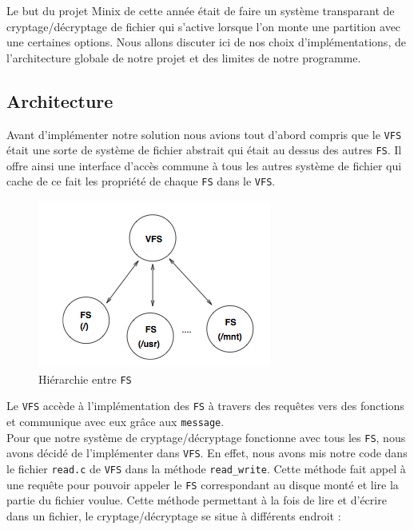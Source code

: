 \documentclass[10pt, onecolumn] {IEEEtran}
\begin{document}
Le but du projet Minix de cette année était de faire un système transparant de cryptage/décryptage de fichier qui s'active lorsque l'on monte une partition avec une certaines options. Nous allons discuter ici de nos choix d'implémentations, de l'architecture globale de notre projet et des limites de notre programme.\\   

\subsection{Architecture}

Avant d'implémenter notre solution nous avions tout d'abord compris que le \texttt{VFS} était une sorte de système de fichier abstrait qui était au dessus des autres \texttt{FS}. Il offre ainsi une interface d'accès commune à tous les autres système de fichier qui cache de ce fait les propriété de chaque \texttt{FS} dans le \texttt{VFS}. 

\begin{figure}[h]
\begin{center}
\includegraphics [scale=0.5] {figures/VFS-FS.png} 
\caption{Hiérarchie entre \texttt{FS}}
\label{default}
\end{center}
\end{figure}
     
Le \texttt{VFS} accède à l'implémentation des \texttt{FS} à travers des requêtes vers des fonctions et communique avec eux grâce aux \texttt{message}. \\

Pour que notre système de cryptage/décryptage fonctionne avec tous les \texttt{FS}, nous avons décidé de l'implémenter dans \texttt{VFS}. En effet, nous avons mis notre code dans le fichier \texttt{read.c} de \texttt{VFS} dans la méthode \texttt{read\_write}. Cette méthode fait appel à une requête pour pouvoir appeler le  \texttt{FS} correspondant au disque monté et lire la partie du fichier voulue. Cette méthode permettant à la fois de lire et d'écrire dans un fichier, le cryptage/décryptage se situe à différents endroit :
\end{document}
